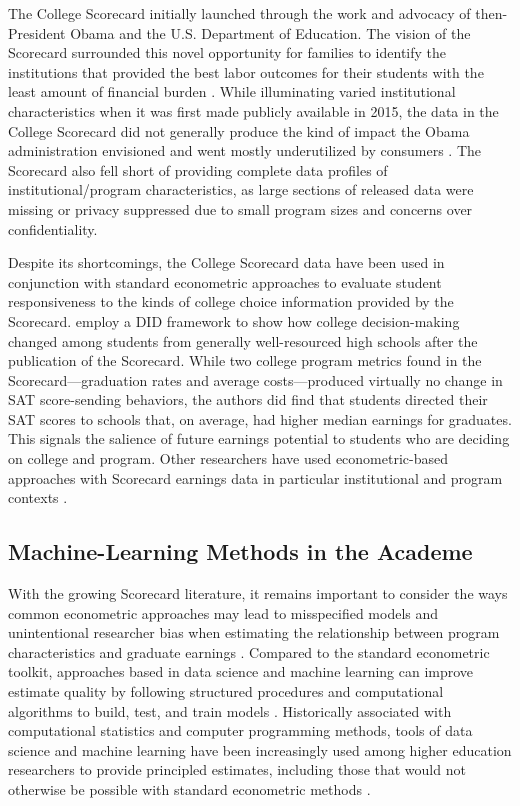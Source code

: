 \documentclass[a4paper, 12pt]{article}
\begin{document}
The College Scorecard initially launched through the work and advocacy
of then-President Obama and the U.S. Department of Education. The
vision of the Scorecard surrounded this novel opportunity for families
to identify the institutions that provided the best labor outcomes for
their students with the least amount of financial burden
\parencite{obama_2013}. While illuminating varied institutional
characteristics when it was first made publicly available in 2015, the
data in the College Scorecard did not generally produce the kind of
impact the Obama administration envisioned and went mostly
underutilized by consumers \parencite{huntington2016search}. The
Scorecard also fell short of providing complete data profiles of
institutional/program characteristics, as large sections of released
data were missing or privacy suppressed due to small program sizes and
concerns over confidentiality.

Despite its shortcomings, the College Scorecard data have been used in
conjunction with standard econometric approaches to evaluate student
responsiveness to the kinds of college choice information provided by
the Scorecard. \textcite{hurwitz_student_2018} employ a DID framework
to show how college decision-making changed among students from
generally well-resourced high schools after the publication of the
Scorecard. While two college program metrics found in the
Scorecard---graduation rates and average costs---produced virtually no
change in SAT score-sending behaviors, the authors did find that
students directed their SAT scores to schools that, on average, had
higher median earnings for graduates. This signals the salience of
future earnings potential to students who are deciding on college and
program. Other researchers have used econometric-based approaches with
Scorecard earnings data in particular institutional and program
contexts \parencite{boland_effect_2021, elu_earnings_2019,
mabel_value_2020, seaman_assessing_2017}.

\subsection*{Machine-Learning Methods in the Academe}

With the growing Scorecard literature, it remains important to
consider the ways common econometric approaches may lead to
misspecified models and unintentional researcher bias when estimating
the relationship between program characteristics and graduate earnings
\parencite{Imbens_2004}. Compared to the standard econometric toolkit,
approaches based in data science and machine learning can improve
estimate quality by following structured procedures and computational
algorithms to build, test, and train models
\parencite{Hastie_etal_2016}. Historically associated with
computational statistics and computer programming methods, tools of
data science and machine learning have been increasingly used among
higher education researchers to provide principled estimates,
including those that would not otherwise be possible with standard
econometric methods \parencite{skinner2021civic, aulck2017predicting,
savvas_etal_2021, Zeineddine_2021}.
\end{document}
